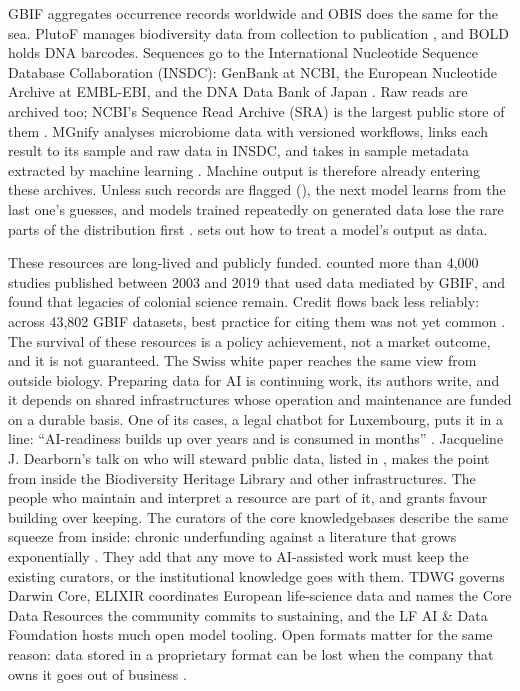 GBIF aggregates occurrence records worldwide and OBIS does the same for the sea.
PlutoF manages biodiversity data from collection to publication
\parencite{koljalg2019plutof}, and BOLD holds DNA barcodes. Sequences go to the
International Nucleotide Sequence Database Collaboration (INSDC): GenBank at
NCBI, the European Nucleotide Archive at EMBL-EBI, and the DNA Data Bank of
Japan \parencite{woodcharlson2026cope}. Raw reads are archived too; NCBI's
Sequence Read Archive (SRA) is the largest public store of them
\parencite{youngblut2026scbasecount}. MGnify analyses microbiome data with
versioned workflows, links each result to its sample and raw data in INSDC, and
takes in sample metadata extracted by machine learning
\parencite{woodcharlson2026cope}. Machine output is therefore already entering
these archives. Unless such records are flagged (), the
next model learns from the last one's guesses, and models trained repeatedly on
generated data lose the rare parts of the distribution first
\parencite{shumailov2024collapse}.  sets out how to treat
a model's output as data.

These resources are long-lived and publicly funded. \textcite{heberling2021gbif}
counted more than 4,000 studies published between 2003 and 2019 that used data
mediated by GBIF, and found that legacies of colonial science remain. Credit
flows back less reliably: across 43,802 GBIF datasets, best practice for
citing them was not yet common \parencite{khan2021gbifcitation}.
The survival of these resources is a policy achievement, not a market outcome,
and it is not guaranteed. The Swiss white paper reaches the same view from
outside biology. Preparing data for AI is continuing work, its authors write,
and it depends on shared infrastructures whose operation and maintenance are
funded on a durable basis. One of its cases, a legal chatbot for Luxembourg,
puts it in a line: ``AI-readiness builds up over years and is consumed in
months'' \parencite{legner2026aireadydata}. Jacqueline J. Dearborn's talk on who will steward
public data, listed in , makes the point from inside the
Biodiversity Heritage Library and other infrastructures. The people who
maintain and interpret a resource are part of it, and grants favour building
over keeping. The curators of the core knowledgebases describe the same
squeeze from inside: chronic underfunding against a literature that grows
exponentially \parencite{pombase2026curation}. They add that any move to
AI-assisted work must keep the existing curators, or the institutional
knowledge goes with them. TDWG governs
Darwin Core, ELIXIR coordinates European life-science data and names the Core
Data Resources the community commits to sustaining, and the LF AI \& Data
Foundation hosts much open model tooling. Open formats matter for the same
reason: data stored in a proprietary format can be lost when the company that
owns it goes out of business \parencite{wilson2013foss}.

